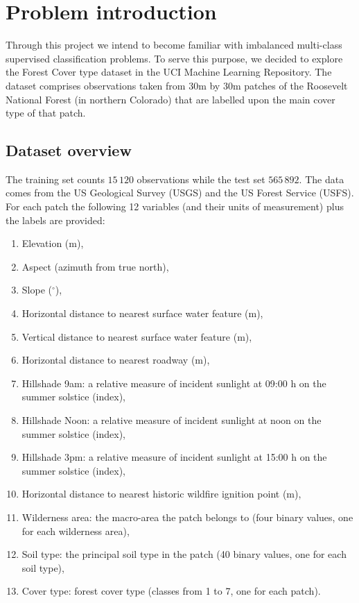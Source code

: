 \chapter{Problem introduction}
Through this project we intend to become familiar with imbalanced multi-class supervised classification problems. To serve this purpose, we decided to explore the Forest Cover type dataset in the UCI Machine Learning Repository. The dataset comprises observations taken from 30m by 30m patches of the Roosevelt National Forest (in northern Colorado) that are labelled upon the main cover type of that patch.

\section{Dataset overview}
The training set counts $15\,120$ observations while the test set $565\,892$. The data comes from the US Geological Survey
(USGS) and the US Forest Service (USFS). For each patch the following 12 variables (and their units of measurement) plus the labels are provided:
\begin{enumerate}
	\item Elevation (m),
	\item Aspect (azimuth from true north),
	\item Slope ($^{\circ}$),
	\item Horizontal distance to nearest surface water feature (m),
	\item Vertical distance to nearest surface water feature (m),
	\item Horizontal distance to nearest roadway (m),
	\item Hillshade 9am: a relative measure of incident sunlight at 09:00 h on the summer solstice (index),
	\item Hillshade Noon: a relative measure of incident sunlight at noon on the summer solstice (index),
	\item Hillshade 3pm: a relative measure of incident sunlight at 15:00 h on the summer solstice (index),
	\item Horizontal distance to nearest historic wildfire ignition point (m),
	\item Wilderness area: the macro-area the patch belongs to (four binary values, one for each wilderness area),
	\item Soil type: the principal soil type in the patch (40 binary values, one for each soil type),
	\item Cover type: forest cover type (classes from 1 to 7, one for each patch).
\end{enumerate}

